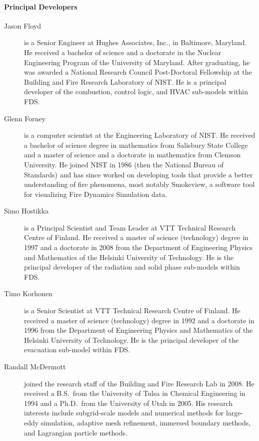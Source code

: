 \paragraph{Principal Developers}

\begin{description}


\item[Jason Floyd] is a Senior Engineer at Hughes Associates, Inc., in Baltimore, Maryland. He received a bachelor of science and a doctorate in the Nuclear Engineering Program of the University of Maryland. After graduating, he was awarded a National Research Council Post-Doctoral Fellowship at the Building and Fire Research Laboratory of NIST. He is a principal developer of the combustion, control logic, and HVAC sub-models within FDS.

\item[Glenn Forney] is a computer scientist at the Engineering Laboratory of NIST.  He received a bachelor of science degree in mathematics from Salisbury State College and a master of science and a doctorate in mathematics from Clemson University.  He joined NIST in 1986 (then the National Bureau of Standards) and has since worked on developing tools that provide a better understanding of fire phenomena, most notably Smokeview, a software tool for visualizing Fire Dynamics Simulation data.

\item[Simo Hostikka] is a Principal Scientist and Team Leader at VTT Technical Research Centre of Finland. He received a master of science (technology) degree in 1997 and a doctorate in 2008 from the Department of Engineering Physics and Mathematics of the Helsinki University of Technology.  He is the principal developer of the radiation and solid phase sub-models within FDS.

\item[Timo Korhonen] is a Senior Scientist at VTT Technical Research Centre of Finland. He received a master of science (technology) degree in 1992 and a doctorate in 1996 from the Department of Engineering Physics and Mathematics of the Helsinki University of Technology. He is the principal developer of the evacuation sub-model within FDS.

\item[Randall McDermott] joined the research staff of the Building and Fire Research Lab in 2008. He received a B.S.~from the University of Tulsa in Chemical Engineering in 1994 and a Ph.D.~from the University of Utah in 2005. His research interests include subgrid-scale models and numerical methods for large-eddy simulation, adaptive mesh refinement, immersed boundary methods, and Lagrangian particle methods.


\end{description}
